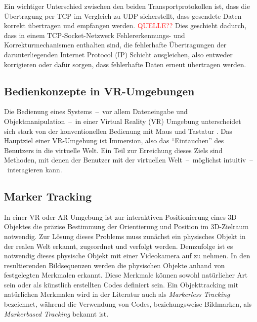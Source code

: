 Ein wichtiger Unterschied zwischen den beiden Transportprotokollen ist, dass die Übertragung per TCP im Vergleich zu UDP sicherstellt, dass gesendete Daten korrekt übertragen und empfangen werden. \textcolor{red}{QUELLE??} Dies geschieht dadurch, dass in einem TCP-Socket-Netzwerk Fehlererkennungs- und Korrekturmechanismen enthalten sind, die fehlerhafte Übertragungen der darunterliegenden Internet Protocol (IP) Schicht ausgleichen, also entweder korrigieren oder dafür sorgen, dass fehlerhafte Daten erneut übertragen werden.


\subsection{Bedienkonzepte in VR-Umgebungen}\label{sec:MenüAnwendungen}
Die Bedienung eines Systems~--~vor allem Dateneingabe und Objektmanipulation~--~in einer Virtual Reality (VR) Umgebung unterscheidet sich stark von der konventionellen Bedienung mit Maus und Tastatur \cite{chu1997multi}. Das Hauptziel einer VR-Umgebung ist Immersion, also das "`Eintauchen"' des Benutzers in die virtuelle Welt. Ein Teil zur Erreichung dieses Ziels sind Methoden, mit denen der Benutzer mit der virtuellen Welt~--~möglichst intuitiv~--~interagieren kann.

\subsection{Marker Tracking} \label{sec:MarkerTracking}
In einer VR oder AR Umgebung ist zur interaktiven Positionierung eines 3D Objektes die präzise Bestimmung der Orientierung und Position im 3D-Zielraum notwendig. Zur Lösung dieses Problems muss zunächst ein physisches Objekt in der realen Welt erkannt, zugeordnet und verfolgt werden. Demzufolge ist es notwendig dieses physische Objekt mit einer Videokamera auf zu nehmen. In den resultierenden Bildsequenzen werden die physischen Objekte anhand von festgelegten Merkmalen erkannt. Diese Merkmale können sowohl natürlicher Art sein oder als künstlich erstellten Codes definiert sein. Ein Objekttracking mit natürlichen Merkmalen wird in der Literatur auch als \textit{Markerless Tracking} bezeichnet, während die Verwendung von Codes, beziehungsweise Bildmarken, als \textit{Markerbased Tracking} bekannt ist.

